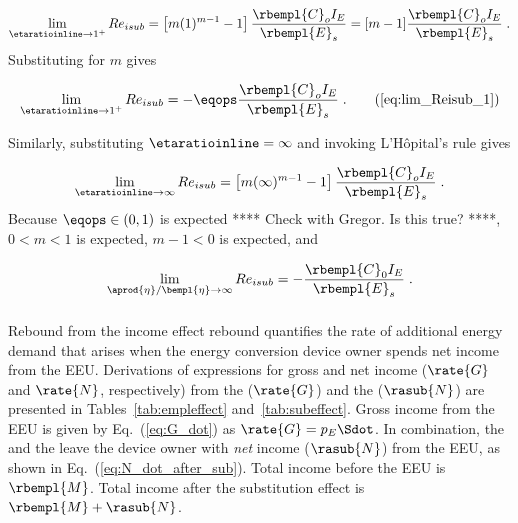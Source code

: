 \begin{equation}
  \lim_{\etaratioinline \to 1^{+}} Re_{isub} 
        = \left[ m ( 1 )^{m-1} - 1 \right] \frac{\rbempl{C}_o I_E}{\rbempl{E}_s}
        = [m - 1] \frac{\rbempl{C}_o I_E}{\rbempl{E}_s} \; .
\end{equation}
%
Substituting for $m$ gives

\begin{equation}
  \lim_{\etaratioinline \to 1^{+}} Re_{isub} 
        = -\eqops \frac{\rbempl{C}_o I_E}{\rbempl{E}_s} \; . \tag{\ref{eq:lim_Reisub_1}}
\end{equation}

Similarly, 
substituting $\etaratioinline = \infty$ and invoking L'H\^{o}pital's rule gives

\begin{equation}
  \lim_{\etaratioinline \to \infty} Re_{isub} 
        = \left[ m ( \infty )^{m-1} - 1 \right] \frac{\rbempl{C}_o I_E}{\rbempl{E}_s} \; .
\end{equation}
%
Because $\eqops \in (0, 1)$ is expected **** Check with Gregor.  Is this true? ****,
$0 < m < 1$ is expected, $m - 1 < 0$ is expected, and

\begin{equation}
  \lim_{\aprod{\eta}/\bempl{\eta} \to \infty} Re_{isub} = -\frac{\rbempl{C}_0 I_E}{\rbempl{E}_s} \; .
\end{equation}


\subsubsection{\Inceffect{}} 
\label{sec:Re_inc}

Rebound from the income effect rebound quantifies the rate of additional energy demand 
that arises when the energy conversion device owner spends net
income from the EEU.
Derivations of expressions for gross and net income ($\rate{G}$ and $\rate{N}$, respectively) from the 
\empleffect{} ($\rate{G}$) and the \subeffect{} ($\rasub{N}$)
are presented in Tables~\ref{tab:empleffect} and~\ref{tab:subeffect}.
Gross income from the EEU is given by Eq.~(\ref{eq:G_dot})
as $\rate{G} = p_E \Sdot$. 
In combination, the \empleffect{} and the \subeffect{} leave the device owner with
\emph{net} income ($\rasub{N}$) from the EEU,
as shown in Eq.~(\ref{eq:N_dot_after_sub}).
Total income before the EEU is $\rbempl{M}$.
Total income after the substitution effect is $\rbempl{M} + \rasub{N}$.

